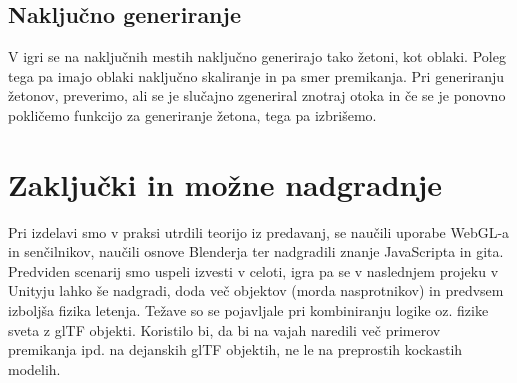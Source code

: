 \documentclass[a4paper]{article}
\begin{document}
\subsection{Naključno generiranje}%
V igri se na naključnih mestih naključno generirajo tako žetoni, kot oblaki. Poleg tega pa imajo oblaki naključno skaliranje in pa smer premikanja. Pri generiranju žetonov, preverimo, ali se je slučajno zgeneriral znotraj otoka in če se je ponovno pokličemo funkcijo za generiranje žetona, tega pa izbrišemo.

\section{Zaključki in možne nadgradnje} %
Pri izdelavi smo v praksi utrdili teorijo iz predavanj, se naučili uporabe WebGL-a in senčilnikov, naučili osnove Blenderja ter nadgradili znanje JavaScripta in gita. Predviden scenarij smo uspeli izvesti v celoti, igra pa se v naslednjem projeku v Unityju lahko še nadgradi, doda več objektov (morda nasprotnikov) in predvsem izboljša fizika letenja. Težave so se pojavljale pri kombiniranju logike oz. fizike sveta z glTF objekti. Koristilo bi, da bi na vajah naredili več primerov premikanja ipd. na dejanskih glTF objektih, ne le na preprostih kockastih modelih. 

\small

%
\end{document}
